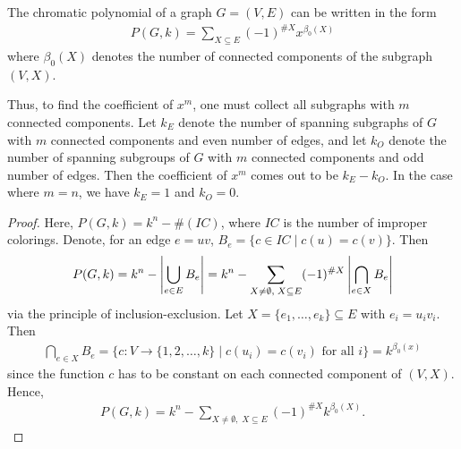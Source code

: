 \begin{theorem}
    The chromatic polynomial of a graph $G = (V,E)$ can be written in the form
    \begin{align}
        P(G,k) = \sum_{X \subseteq E} (-1)^{\#X}x^{\beta_{0}(X)}
    \end{align}
    where $\beta_{0}(X)$ denotes the number of connected components of the subgraph $(V,X)$.
\end{theorem}
Thus, to find the coefficient of $x^{m}$, one must collect all subgraphs with $m$ connected components. Let $k_{E}$ denote the number of spanning subgraphs of $G$ with $m$ connected components and even number of edges, and let $k_{O}$ denote the number of spanning subgroups of $G$ with $m$ connected components and odd number of edges. Then the coefficient of $x^{m}$ comes out to be $k_{E}-k_{O}$. In the case where $m = n$, we have $k_{E} = 1$ and $k_{O} = 0$.

\begin{proof}
    Here, $P(G,k) = k^{n} - \#(IC)$, where $IC$ is the number of improper colorings. Denote, for an edge $e = uv$, $B_{e} = \{c \in IC \mid c(u) = c(v)\}$. Then
    \begin{align}
        P(G,k) = k^{n} - \left| \bigcup_{e \in E} B_{e} \right| = k^{n} - \sum_{X \neq \emptyset,\;X \subseteq E} (-1)^{\#X}\left| \bigcap_{e \in X} B_{e} \right|
    \end{align}
    via the principle of inclusion-exclusion. Let $X = \{e_{1},\ldots,e_{k}\} \subseteq E$ with $e_{i} = u_{i}v_{i}$. Then
    \begin{align}
        \bigcap_{e \in X} B_{e} = \{c:V \to \{1,2,\ldots,k\} \mid c(u_{i}) = c(v_{i}) \text{ for all } i\} = k^{\beta_{0}(x)}
    \end{align}
    since the function $c$ has to be constant on each connected component of $(V,X)$. Hence,
    \begin{align}
        P(G,k) = k^{n} - \sum_{X \neq \emptyset,\;X \subseteq E} (-1)^{\#X} k^{\beta_{0}(X)}.
    \end{align}
\end{proof}

